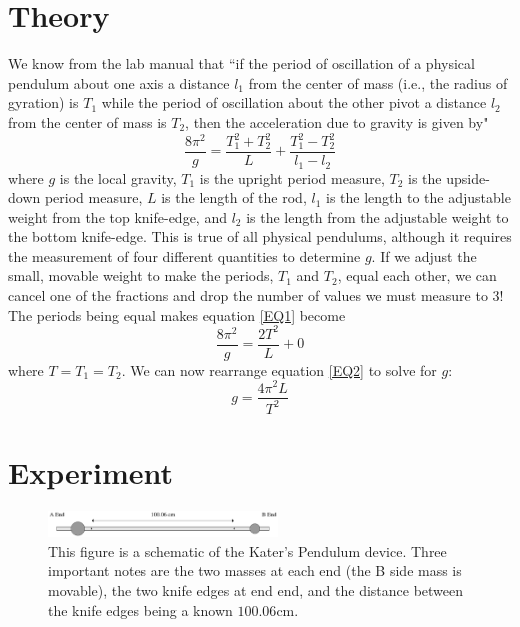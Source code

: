 \documentclass[aps,prl,10pt,twocolumn,floatfix]{revtex4-2}
\begin{document}
\section{Theory}\label{Theory}
We know from the lab manual that ``if the period of oscillation of a physical pendulum about one axis a distance $l_1$ from the center of mass (i.e., the radius of gyration) is $T_1$ while the period of oscillation about the other pivot a distance $l_2$ from the center of mass is $T_2$, then the acceleration due to gravity is given by\cite{Manual}"
\begin{equation}\label{EQ1}
\frac{8\pi^2}{g}=\frac{T_1^2+T_2^2}{L}+\frac{T_1^2-T_2^2}{l_1-l_2}
\end{equation}
where $g$ is the local gravity, $T_1$ is the upright period measure, $T_2$ is the upside-down period measure, $L$ is the length of the rod, $l_1$ is the length to the adjustable weight from the top knife-edge, and $l_2$ is the length from the adjustable weight to the bottom knife-edge. 
This is true of all physical pendulums, although it requires the measurement of four different quantities to determine $g$. 
If we adjust the small, movable weight to make the periods, $T_1$ and $T_2$, equal each other, we can cancel one of the fractions and drop the number of values we must measure to 3!
The periods being equal makes equation \ref{EQ1} become
\begin{equation}\label{EQ2}
\frac{8\pi^2}{g}=\frac{2T^2}{L}+0
\end{equation}
where $T=T_1=T_2$.
We can now rearrange equation \ref{EQ2} to solve for $g$:
\begin{equation}
g=\frac{4\pi^2L}{T^2}
\end{equation}

\section{Experiment}
\begin{figure}
\includegraphics[width=230px]{diagram.eps}
\caption{This figure is a schematic of the Kater's Pendulum device. Three important notes are the two masses at each end (the B side mass is movable), the two knife edges at end end, and the distance between the knife edges being a known $100.06$cm.}
\label{pendulum}
\end{figure}
\end{document}
